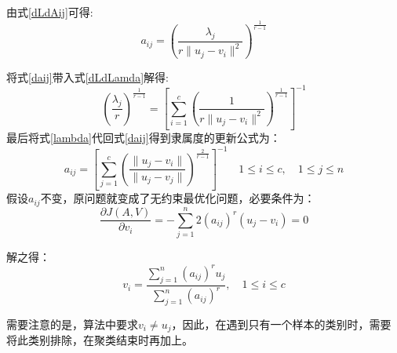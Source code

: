 由式\ref{dLdAij}可得:
\begin{equation}
    a_{i j}=\left( \frac{\lambda_j}{r \|u_{j}-v_{i}\|^2} \right)^{\frac{1}{r-1}}
    \label{daij}
\end{equation}

将式\ref{daij}带入式\ref{dLdLamda}解得:
\begin{equation}
    \left(\frac{\lambda_j}{r}\right)^{\frac{1}{r-1}}=\left[\sum\limits_{i=1}^c( \frac{1}{r \|u_{j}-v_{i}\|^2})^{\frac{1}{r-1}} \right]^{-1}
    \label{lambda}
\end{equation}
最后将式\ref{lambda}代回式\ref{daij}得到隶属度的更新公式为：
\begin{equation}
    a_{i j}=\left[\sum\limits_{j=1}^c\left( \frac{\|u_{j}-v_{i}\|}{\|u_{j}-v_{j}\|} \right)^{\frac{2}{r-1}}\right]^{-1}
    \quad 1 \leqslant i \leqslant c,\quad 1 \leqslant j \leqslant n
    \label{aij}
\end{equation}
假设$a_{i j}$不变，原问题就变成了无约束最优化问题，必要条件为：
\begin{equation}
        \frac{\partial J(A, V)}{\partial v_{i}}=-\sum_{j=1}^{n} 2\left(a_{i j}\right)^{r}\left(u_{j}-v_{i}\right)=0 
\end{equation}

解之得：
\begin{equation}
    v_{i}=\frac{\sum\limits_{j=1}^{n}\left(a_{i j}\right)^{r} u_{j}}{\sum\limits_{j=1}^{n}\left(a_{i j}\right)^{r}}, \quad 1 \leqslant i \leqslant c
    \label{vij}
\end{equation}
\par
需要注意的是，算法中要求$v_i \neq  u_j$，因此，在遇到只有一个样本的类别时，需要将此类别排除，在聚类结束时再加上。
